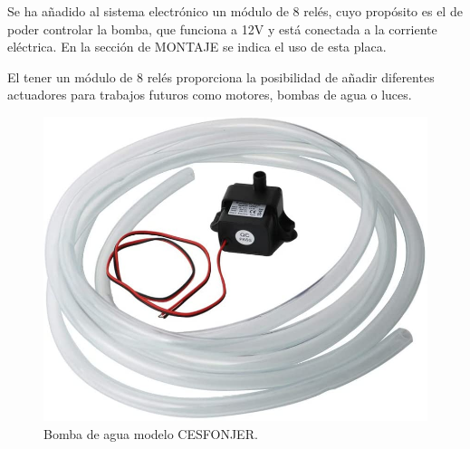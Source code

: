 \documentclass[a4paper, 12pt, oneside]{book}
\begin{document}
Se ha añadido al sistema electrónico un módulo de 8 relés, cuyo propósito es el de poder controlar la bomba, que funciona a 12V y está conectada a la corriente eléctrica. En la sección de MONTAJE se indica el uso de esta placa.

El tener un módulo de 8 relés proporciona la posibilidad de añadir diferentes actuadores para trabajos futuros como motores, bombas de agua o luces.

\begin{figure}[H]
  \centering
  \begin{minipage}[b]{0.4\textwidth}
    \includegraphics[width=\textwidth]{img/bomba_cesfonjer}
    \caption{Bomba de agua modelo CESFONJER.}
    \label{figura:bomba_cesfonjer}
  \end{minipage}
  \hfill
  \begin{minipage}[b]{0.4\textwidth}

\end{minipage}
\end{figure}
\end{document}
